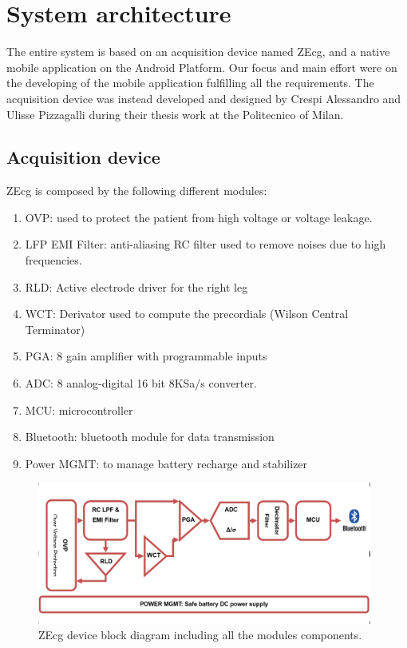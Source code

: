 \chapter{System architecture}
\label{Chapter8}
The entire system is based on an acquisition device named ZEcg, and a native mobile application on the Android Platform. Our focus and main effort were on the developing of the mobile application fulfilling all the requirements. The acquisition device was instead developed and designed by Crespi Alessandro and Ulisse Pizzagalli during their thesis work at the Politecnico of Milan.~\cite{ref22}
\section{Acquisition device}
ZEcg is composed by the following different modules:
\begin{enumerate}
	\item OVP: used to protect the patient from high voltage or voltage leakage.
	\item LFP EMI Filter: anti-aliasing RC filter used to remove noises due to high frequencies.
	\item RLD: Active electrode driver for the right leg
	\item WCT: Derivator used to compute the precordials (Wilson Central Terminator)
	\item PGA: 8 gain amplifier with programmable inputs
	\item ADC: 8 analog-digital 16 bit 8KSa/s converter.
	\item MCU: microcontroller
	\item Bluetooth: bluetooth module for data transmission
	\item Power MGMT: to manage battery recharge and stabilizer
\end{enumerate}
\begin{figure}[ht!]
	\centering
	\includegraphics[width=110mm]{figures/ch8/1.png}
	\caption{ZEcg device block diagram including all the modules components.}
	\label{fig8.1}
\end{figure}
